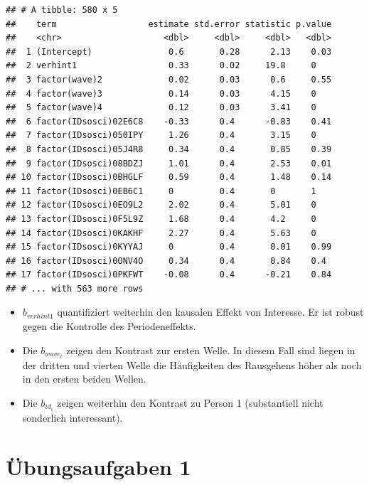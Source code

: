 \documentclass[]{book}
\providecommand{\tightlist}{%
  \setlength{\itemsep}{0pt}\setlength{\parskip}{0pt}}
\begin{document}
\begin{verbatim}
## # A tibble: 580 x 5
##    term                  estimate std.error statistic p.value
##    <chr>                    <dbl>     <dbl>     <dbl>   <dbl>
##  1 (Intercept)               0.6       0.28      2.13    0.03
##  2 verhint1                  0.33      0.02     19.8     0   
##  3 factor(wave)2             0.02      0.03      0.6     0.55
##  4 factor(wave)3             0.14      0.03      4.15    0   
##  5 factor(wave)4             0.12      0.03      3.41    0   
##  6 factor(IDsosci)02E6C8    -0.33      0.4      -0.83    0.41
##  7 factor(IDsosci)050IPY     1.26      0.4       3.15    0   
##  8 factor(IDsosci)05J4R8     0.34      0.4       0.85    0.39
##  9 factor(IDsosci)08BDZJ     1.01      0.4       2.53    0.01
## 10 factor(IDsosci)0BHGLF     0.59      0.4       1.48    0.14
## 11 factor(IDsosci)0EB6C1     0         0.4       0       1   
## 12 factor(IDsosci)0EO9L2     2.02      0.4       5.01    0   
## 13 factor(IDsosci)0F5L9Z     1.68      0.4       4.2     0   
## 14 factor(IDsosci)0KAKHF     2.27      0.4       5.63    0   
## 15 factor(IDsosci)0KYYAJ     0         0.4       0.01    0.99
## 16 factor(IDsosci)0ONV4O     0.34      0.4       0.84    0.4 
## 17 factor(IDsosci)0PKFWT    -0.08      0.4      -0.21    0.84
## # ... with 563 more rows
\end{verbatim}

\begin{itemize}
\tightlist
\item
  \(b_{verhint1}\) quantifiziert weiterhin den kausalen Effekt von Interesse. Er ist robust gegen die Kontrolle des Periodeneffekts.
\item
  Die \(b_{wave_t}\) zeigen den Kontrast zur ersten Welle. In diesem Fall sind liegen in der dritten und vierten Welle die Häufigkeiten des Rausgehens höher als noch in den ersten beiden Wellen.
\item
  Die \(b_{id_i}\) zeigen weiterhin den Kontrast zu Person 1 (substantiell nicht sonderlich interessant).
\end{itemize}

\hypertarget{uxfcbungsaufgaben-1}{%
\section{Übungsaufgaben 1}\label{uxfcbungsaufgaben-1}}
\end{document}
